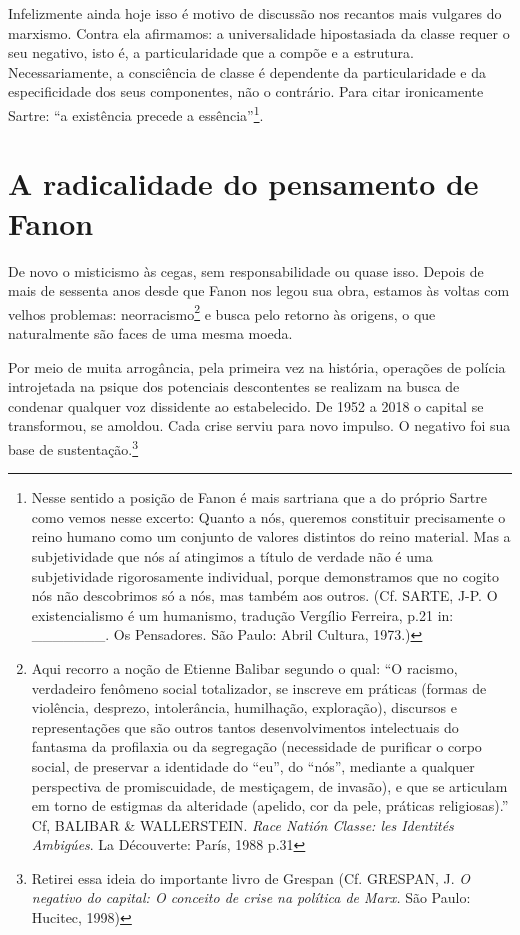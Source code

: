 Infelizmente ainda hoje isso é motivo de discussão nos recantos mais
vulgares do marxismo. Contra ela afirmamos: a universalidade
hipostasiada da classe requer o seu negativo, isto é, a particularidade
que a compõe e a estrutura. Necessariamente, a consciência de classe é
dependente da particularidade e da especificidade dos seus componentes,
não o contrário. Para citar ironicamente Sartre: ``a existência precede
a essência''\footnote{Nesse sentido a posição de Fanon é mais sartriana
  que a do próprio Sartre como vemos nesse excerto: Quanto a nós,
  queremos constituir precisamente o reino humano como um conjunto de
  valores distintos do reino material. Mas a subjetividade que nós aí
  atingimos a título de verdade não é uma subjetividade rigorosamente
  individual, porque demonstramos que no cogito nós não descobrimos só a
  nós, mas também aos outros. (Cf. SARTE, J-P. O existencialismo é um
  humanismo, tradução Vergílio Ferreira, p.21 in: \_\_\_\_\_\_\_. Os
  Pensadores. São Paulo: Abril Cultura, 1973.)}.

\chapter{A radicalidade do pensamento de Fanon}

De novo o misticismo às cegas, sem responsabilidade ou quase isso.
Depois de mais de sessenta anos desde que Fanon nos legou sua obra,
estamos às voltas com velhos problemas: neorracismo\footnote{Aqui
  recorro a noção de Etienne Balibar segundo o qual: ``O racismo,
  verdadeiro fenômeno social totalizador, se inscreve em práticas
  (formas de violência, desprezo, intolerância, humilhação, exploração),
  discursos e representações que são outros tantos desenvolvimentos
  intelectuais do fantasma da profilaxia ou da segregação (necessidade
  de purificar o corpo social, de preservar a identidade do ``eu'', do
  ``nós'', mediante a qualquer perspectiva de promiscuidade, de
  mestiçagem, de invasão), e que se articulam em torno de estigmas da
  alteridade (apelido, cor da pele, práticas religiosas).'' Cf, BALIBAR
  \& WALLERSTEIN. \emph{Race Natión Classe: les Identités Ambigúes}. La
  Découverte: París, 1988 p.31} e busca pelo retorno às origens, o que
naturalmente são faces de uma mesma moeda.

Por meio de muita arrogância, pela primeira vez na história, operações
de polícia introjetada na psique dos potenciais descontentes se realizam
na busca de condenar qualquer voz dissidente ao estabelecido. De 1952 a
2018 o capital se transformou, se amoldou. Cada crise serviu para novo
impulso. O negativo foi sua base de sustentação.\footnote{Retirei essa
  ideia do importante livro de Grespan (Cf. GRESPAN, J. \emph{O negativo
  do capital: O conceito de crise na política de Marx.} São Paulo:
  Hucitec, 1998)}

